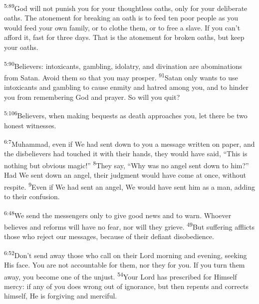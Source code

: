 \documentclass[openany,12pt,english]{book}
\newenvironment{para}{\par\pretolerance=100\tolerance=200\setlength{\emergencystretch}{0.6em}\relax}{\par}
\begin{document}
\begin{para}
    \textsuperscript{5:89}\thinspace{}God will not pun\-ish you for your thought\-less oaths, on\-ly for your de\-lib\-er\-ate oaths. The a\-tone\-ment for break\-ing an oath is to feed ten poor peo\-ple as you would feed your own fam\-i\-ly, or to clothe them, or to free a slave. If you can't af\-ford it, fast for three days. That is the a\-tone\-ment for bro\-ken oaths, but keep your oaths.
\end{para}

\begin{para}
    \textsuperscript{5:90}\thinspace{}Believers: intoxicants, gambling, i\-dol\-a\-try, and div\-i\-na\-tion are abominations from Satan. A\-void them so that you may pros\-per.
    \textsuperscript{91}\thinspace{}Satan on\-ly wants to use intoxicants and gambling to cause en\-mi\-ty and ha\-tred a\-mong you, and to hind\-er you from remembering God and pray\-er. So will you quit?
\end{para}

\begin{para}
    \textsuperscript{5:106}\thinspace{}Believers, when mak\-ing bequests as death approaches you, let there be two hon\-est witnesses.
\end{para}

\bigskip{}

\begin{para}
    \textsuperscript{6:7}\thinspace{}Muhammad, e\-ven if We had sent down to you a mes\-sage writ\-ten on pa\-per, and the disbelievers had touched it with their hands, they would have said, “This is noth\-ing but ob\-vi\-ous mag\-ic!”
    \textsuperscript{8}\thinspace{}They say, “Why was no an\-gel sent down to him?” Had We sent down an an\-gel, their judg\-ment would have come at once, with\-out res\-pite.
    \textsuperscript{9}\thinspace{}E\-ven if We had sent an an\-gel, We would have sent him as a man, adding to their con\-fu\-sion.
\end{para}

\begin{para}
    \textsuperscript{6:48}\thinspace{}We send the messengers on\-ly to give good news and to warn. Who\-ev\-er believes and reforms will have no fear, nor will they grieve.
    \textsuperscript{49}\thinspace{}But suf\-fer\-ing afflicts those who re\-ject our messages, be\-cause of their de\-fi\-ant dis\-o\-be\-di\-ence.
\end{para}

\begin{para}
    \textsuperscript{6:52}\thinspace{}Don't send a\-way those who call on their Lord morn\-ing and eve\-ning, seek\-ing His face. You are not ac\-count\-a\-ble for them, nor they for you. If you turn them a\-way, you be\-come one of the un\-just.
    \textsuperscript{54}\thinspace{}Your Lord has pre\-scribed for Him\-self mer\-cy: if any of you does wrong out of ig\-no\-rance, but then repents and corrects him\-self, He is for\-giv\-ing and mer\-ci\-ful.
\end{para}
\end{document}
